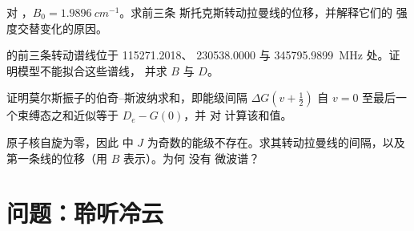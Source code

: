 \begin{exercise}[$\star\star$]\label{exo:b3:rovibrational-spectroscopy:9}
对 ，$B_0 = \qty{1.9896}{cm^{-1}}$。求前三条
斯托克斯转动拉曼线的位移，并解释它们的
强度交替变化的原因。
\end{exercise}

\begin{exercise}[$\star\star\star$]\label{exo:b3:rovibrational-spectroscopy:10}
 的前三条转动谱线位于 115271.2018、
230538.0000 与 \qty{345795.9899}{MHz} 处。证明模型不能拟合这些谱线，
并求 $B$ 与 $D$。
\end{exercise}

\begin{exercise}[$\star\star\star$]\label{exo:b3:rovibrational-spectroscopy:11}
证明莫尔斯振子的伯奇–斯波纳求和，即能级间隔 $\Delta G(v + \frac12)$ 自 $v = 0$
至最后一个束缚态之和近似等于 $D_e - G(0)$，并
对  计算该和值。
\end{exercise}

\begin{exercise}[$\star\star\star$]\label{exo:b3:rovibrational-spectroscopy:12}
 原子核自旋为零，因此  中
$J$ 为奇数的能级不存在。求其转动拉曼线的间隔，以及
第一条线的位移（用 $B$ 表示）。为何  没有
微波谱？
\end{exercise}

\section{问题：聆听冷云}

